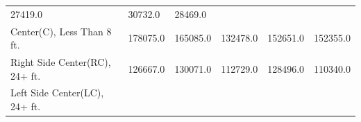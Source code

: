 \documentclass[]{article}
\begin{document}
\begin{longtable}[]{@{}llllll@{}}
\begin{minipage}[t]{0.14\columnwidth}
27419.0\strut
\end{minipage} & \begin{minipage}[t]{0.14\columnwidth}\raggedright
30732.0\strut
\end{minipage} & \begin{minipage}[t]{0.14\columnwidth}\raggedright
28469.0\strut
\end{minipage}\tabularnewline
\begin{minipage}[t]{0.14\columnwidth}\raggedright
Center(C), Less Than 8 ft.\strut
\end{minipage} & \begin{minipage}[t]{0.14\columnwidth}\raggedright
178075.0\strut
\end{minipage} & \begin{minipage}[t]{0.14\columnwidth}\raggedright
165085.0\strut
\end{minipage} & \begin{minipage}[t]{0.14\columnwidth}\raggedright
132478.0\strut
\end{minipage} & \begin{minipage}[t]{0.14\columnwidth}\raggedright
152651.0\strut
\end{minipage} & \begin{minipage}[t]{0.14\columnwidth}\raggedright
152355.0\strut
\end{minipage}\tabularnewline
\begin{minipage}[t]{0.14\columnwidth}\raggedright
Right Side Center(RC), 24+ ft.\strut
\end{minipage} & \begin{minipage}[t]{0.14\columnwidth}\raggedright
126667.0\strut
\end{minipage} & \begin{minipage}[t]{0.14\columnwidth}\raggedright
130071.0\strut
\end{minipage} & \begin{minipage}[t]{0.14\columnwidth}\raggedright
112729.0\strut
\end{minipage} & \begin{minipage}[t]{0.14\columnwidth}\raggedright
128496.0\strut
\end{minipage} & \begin{minipage}[t]{0.14\columnwidth}\raggedright
110340.0\strut
\end{minipage}\tabularnewline
\begin{minipage}[t]{0.14\columnwidth}\raggedright
Left Side Center(LC), 24+ ft.\strut
\end{minipage} & \begin{minipage}[t]{0.14\columnwidth}\raggedright

\end{minipage}
\end{longtable}
\end{document}
